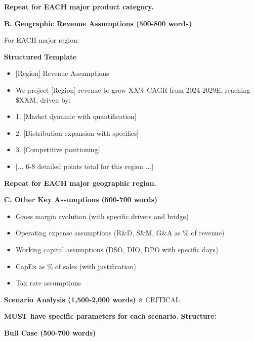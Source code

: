 \documentclass[11pt]{article}
\begin{document}
\textbf{Repeat for EACH major product category.}


\textbf{B. Geographic Revenue Assumptions (500-800 words)}


For EACH major region:

\textbf{Structured Template}
\begin{itemize}[leftmargin=*,itemsep=2pt,topsep=2pt]
\item {} [Region] Revenue Assumptions
\item {} We project [Region] revenue to grow XX\% CAGR from 2024-2029E, reaching \$XXM, driven by:
\item {} 1. [Market dynamic with quantification]
\item {} 2. [Distribution expansion with specifics]
\item {} 3. [Competitive positioning]
\item {} [... 6-8 detailed points total for this region ...]
\end{itemize}

\textbf{Repeat for EACH major geographic region.}


\textbf{C. Other Key Assumptions (500-700 words)}

\begin{itemize}[leftmargin=*,itemsep=2pt,topsep=2pt]
\item {} Gross margin evolution (with specific drivers and bridge)
\item {} Operating expense assumptions (R\&D, S\&M, G\&A as \% of revenue)
\item {} Working capital assumptions (DSO, DIO, DPO with specific days)
\item {} CapEx as \% of sales (with justification)
\item {} Tax rate assumptions
\end{itemize}

\textbf{Scenario Analysis (1,500-2,000 words)} ⭐ CRITICAL


\textbf{MUST have specific parameters for each scenario. Structure:}


\textbf{Bull Case (500-700 words)}
\end{document}
